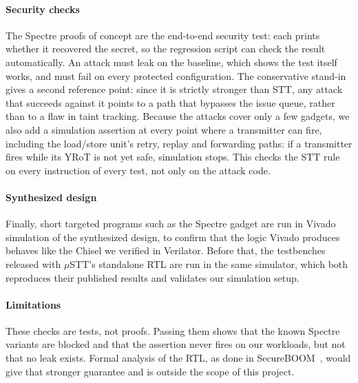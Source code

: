 \paragraph{Security checks}
The Spectre proofs of concept are the end-to-end security test: each prints
whether it recovered the secret, so the regression script can check the
result automatically. An attack must leak on the baseline, which shows the
test itself works, and must fail on every protected configuration. The
conservative stand-in gives a second reference point: since it is strictly
stronger than STT, any attack that succeeds against it points to a path that
bypasses the issue queue, rather than to a flaw in taint tracking. Because the
attacks cover only a few gadgets, we also add a simulation assertion at every
point where a transmitter can fire, including the load/store unit's retry,
replay and forwarding paths: if a transmitter fires while its YRoT is not yet
safe, simulation stops. This checks the STT rule on every instruction of every
test, not only on the attack code.

\paragraph{Synthesized design}
Finally, short targeted programs such as the Spectre gadget are run in Vivado
simulation of the synthesized design, to confirm that the logic Vivado
produces behaves like the Chisel we verified in Verilator. Before that, the
testbenches released with $\mu$STT's standalone RTL are run in the same
simulator, which both reproduces their published results and validates our
simulation setup.

\paragraph{Limitations}
These checks are tests, not proofs. Passing them shows that the known Spectre
variants are blocked and that the assertion never fires on our workloads, but
not that no leak exists. Formal analysis of the RTL, as done in
SecureBOOM~\cite{Jauch:SecureBOOM:2023}, would give that stronger guarantee and
is outside the scope of this project.
